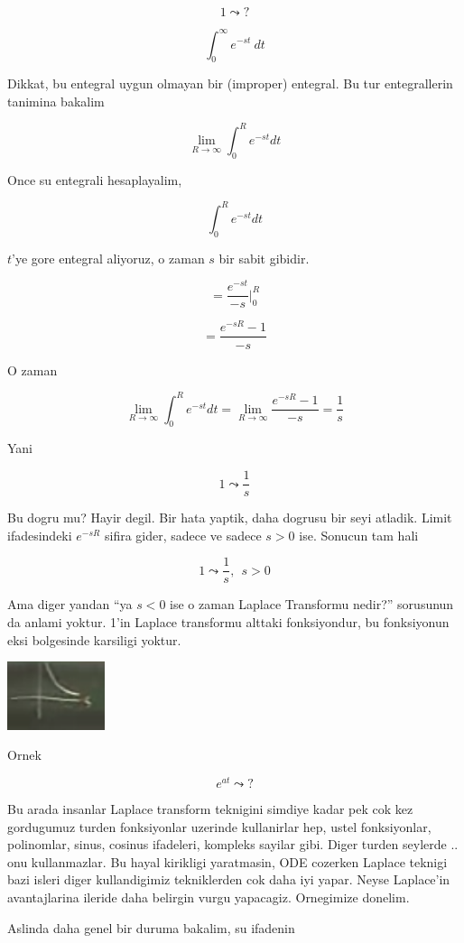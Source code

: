 \documentclass[12pt,fleqn]{article}\usepackage{../common}
\begin{document}
\[ 1 \leadsto ? \]

\[ \int_0^{\infty} e^{-st} \ dt \]

Dikkat, bu entegral uygun olmayan bir (improper) entegral. Bu tur
entegrallerin tanimina bakalim

\[ \lim_{R \to \infty}  \int_{0}^{R} e^{-st} dt  \]

Once su entegrali hesaplayalim, 

\[  \int_{0}^{R} e^{-st} dt \]

$t$'ye gore entegral aliyoruz, o zaman $s$ bir sabit gibidir. 

\[  = \frac{ e^{-st}}{-s}  \bigg|_{0}^{R} \]

\[ = \frac{e^{-sR} - 1}{-s} \]

O zaman 

\[ \lim_{R \to \infty}  \int_{0}^{R} e^{-st} dt  = 
\lim_{R \to \infty} \frac{e^{-sR} - 1}{-s}  = 
\frac{1}{s}
\]

Yani 

\[ 1 \leadsto \frac{1}{s} \]

Bu dogru mu? Hayir degil. Bir hata yaptik, daha dogrusu bir seyi
atladik. Limit ifadesindeki $e^{-sR}$ sifira gider, sadece ve sadece $s >
0$ ise. 
Sonucun tam hali 

\[ 1 \leadsto \frac{1}{s}, \ \ s > 0 \]

Ama diger yandan ``ya $s < 0$ ise o zaman Laplace Transformu nedir?''
sorusunun da anlami yoktur. 1'in Laplace transformu alttaki fonksiyondur,
bu fonksiyonun eksi bolgesinde karsiligi yoktur. 

\includegraphics[height=2cm]{19_2.png}

Ornek 

\[ e^{at} \leadsto ? \]

Bu arada insanlar Laplace transform teknigini simdiye kadar pek cok kez
gordugumuz turden fonksiyonlar uzerinde kullanirlar hep, ustel fonksiyonlar,
polinomlar, sinus, cosinus ifadeleri, kompleks sayilar gibi. Diger turden
seylerde .. onu kullanmazlar. Bu hayal kirikligi yaratmasin, ODE cozerken
Laplace teknigi bazi isleri diger kullandigimiz tekniklerden cok daha iyi
yapar. Neyse Laplace'in avantajlarina ileride daha belirgin vurgu
yapacagiz. Ornegimize donelim. 

Aslinda daha genel bir duruma bakalim, su ifadenin
\end{document}
